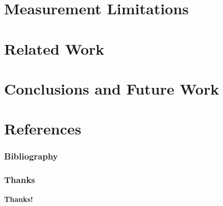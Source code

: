 \documentclass[notes]{beamer}
\begin{document}
\section{Measurement Limitations}
\begin{frame}

\end{frame}

\section{Related Work}
\begin{frame}

\end{frame}

\section{Conclusions and Future Work}
\begin{frame}

\end{frame}

\section{References}
\begin{frame} %

\frametitle{Bibliography}




\end{frame}

\begin{frame}
\frametitle{Thanks}
\vskip20pt

\begin{center}
{\bf \color{alert} Thanks!}
\end{center}

\vskip20pt

\begin{center}

\vskip12pt
\end{center}

\titlepage
\end{frame}
\end{document}
